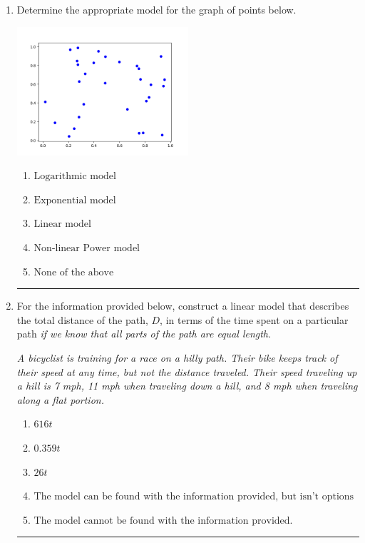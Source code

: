 \documentclass[14pt]{extbook}
\newcommand{\litem}[1]{\item#1\hspace*{-1cm}\rule{\textwidth}{0.4pt}}
\begin{document}
\begin{enumerate}
{\begin{enumerate}[label=\Alph*.]
\end{enumerate} }
\litem{
Determine the appropriate model for the graph of points below.
\begin{center}
    \includegraphics[width=0.5\textwidth]{../Figures/identifyModelGraph12B.png}
\end{center}
\begin{enumerate}[label=\Alph*.]
\item \( \text{Logarithmic model} \)
\item \( \text{Exponential model} \)
\item \( \text{Linear model} \)
\item \( \text{Non-linear Power model} \)
\item \( \text{None of the above} \)

\end{enumerate} }
\litem{
For the information provided below, construct a linear model that describes the total distance of the path, $D$, in terms of the time spent on a particular path \textit{if we know that all parts of the path are equal length}.
\begin{center}
    \textit{ A bicyclist is training for a race on a hilly path. Their bike keeps track of their speed at any time, but not the distance traveled. Their speed traveling up a hill is 7 mph, 11 mph when traveling down a hill, and 8 mph when traveling along a flat portion. }
\end{center}
\begin{enumerate}[label=\Alph*.]
\item \( 616 t \)
\item \( 0.359 t \)
\item \( 26 t \)
\item \( \text{The model can be found with the information provided, but isn't options 1-3.} \)
\item \( \text{The model cannot be found with the information provided.} \)


\end{enumerate}}
\end{enumerate}
\end{document}
